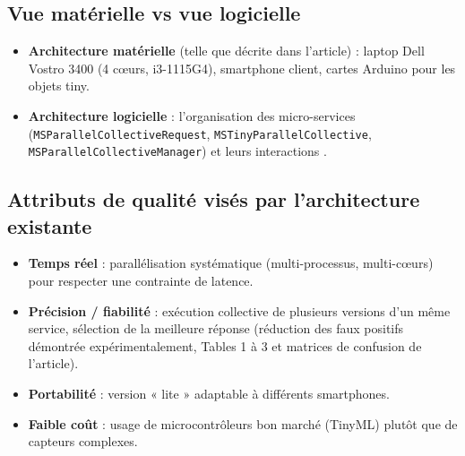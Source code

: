 \documentclass[11pt,a4paper]{article}
\begin{document}
\subsection{Vue matérielle vs vue logicielle }
\begin{itemize}
\item \textbf{Architecture matérielle} (telle que décrite dans l'article) : laptop Dell Vostro 3400 (4 cœurs, i3-1115G4), smartphone client, cartes Arduino pour les objets tiny.
\item \textbf{Architecture logicielle} : l'organisation des micro-services (\texttt{MSParallelCollectiveRequest}, \texttt{MSTinyParallelCollective}, \texttt{MSParallelCollectiveManager}) et leurs interactions .
\end{itemize}

\subsection{Attributs de qualité visés par l'architecture existante}
\begin{itemize}
\item \textbf{Temps réel} : parallélisation systématique (multi-processus, multi-cœurs) pour respecter une contrainte de latence.
\item \textbf{Précision / fiabilité} : exécution collective de plusieurs versions d'un même service, sélection de la meilleure réponse (réduction des faux positifs démontrée expérimentalement, Tables 1 à 3 et matrices de confusion de l'article).
\item \textbf{Portabilité} : version « lite » adaptable à différents smartphones.
\item \textbf{Faible coût} : usage de microcontrôleurs bon marché (TinyML) plutôt que de capteurs complexes.
\end{itemize}
\end{document}
